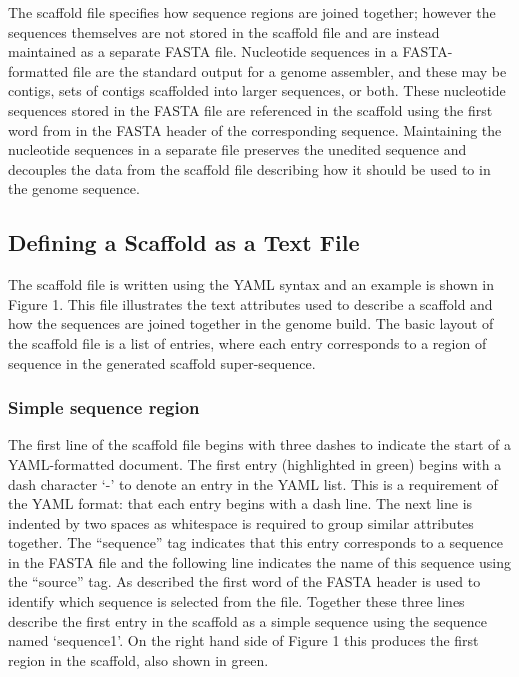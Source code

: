\documentclass[10pt]{bmc_article}
\newenvironment{bmcformat}{\begin{raggedright}\baselineskip20pt\sloppy\setboolean{publ}{false}}{\end{raggedright}\baselineskip20pt\sloppy}
\begin{document}
\begin{bmcformat}
The scaffold file specifies how sequence regions are joined together; however
the sequences themselves are not stored in the scaffold file and are instead
maintained as a separate FASTA file. Nucleotide sequences in a FASTA-formatted
file are the standard output for a genome assembler, and these may be contigs,
sets of contigs scaffolded into larger sequences, or both. These nucleotide
sequences stored in the FASTA file are referenced in the scaffold using the
first word from in the FASTA header of the corresponding sequence. Maintaining
the nucleotide sequences in a separate file preserves the unedited sequence and
decouples the data from the scaffold file describing how it should be used to
in the genome sequence. \pb

\subsection*{Defining a Scaffold as a Text File} %

The scaffold file is written using the YAML syntax and an example is shown in
Figure 1. This file illustrates the text attributes used to describe a scaffold
and how the sequences are joined together in the genome build. The basic layout
of the scaffold file is a list of entries, where each entry corresponds to
a region of sequence in the generated scaffold super-sequence. \pb

\subsubsection*{Simple sequence region} %

The first line of the scaffold file begins with three dashes to indicate the
start of a YAML-formatted document. The first entry (highlighted in green)
begins with a dash character `-' to denote an entry in the YAML list. This is
a requirement of the YAML format: that each entry begins with a dash line. The
next line is indented by two spaces as whitespace is required to group similar
attributes together. The ``sequence'' tag indicates that this entry corresponds
to a sequence in the FASTA file and the following line indicates the name of
this sequence using the ``source'' tag. As described the first word of the
FASTA header is used to identify which sequence is selected from the file.
Together these three lines describe the first entry in the scaffold as a simple
sequence using the sequence named `sequence1'. On the right hand side of Figure
1 this produces the first region in the scaffold, also shown in green. \pb


\end{bmcformat}
\end{document}
